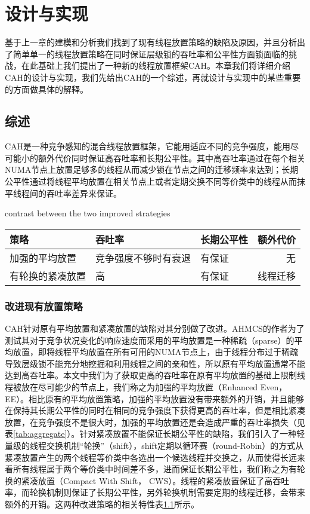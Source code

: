 \chapter{设计与实现}
\label{chap:faq}
基于上一章的建模和分析我们找到了现有线程放置策略的缺陷及原因，并且分析出了简单单一的线程放置策略在同时保证层级锁的吞吐率和公平性方面锁面临的挑战，在此基础上我们提出了一种新的线程放置框架CAH。本章我们将详细介绍CAH的设计与实现，我们先给出CAH的一个综述，再就设计与实现中的某些重要的方面做具体的解释。

\section{综述}
CAH是一种竞争感知的混合线程放置框架，它能用适应不同的竞争强度，能用尽可能小的额外代价同时保证高吞吐率和长期公平性。其中高吞吐率通过在每个相关NUMA节点上放置足够多的线程从而减少锁在节点之间的迁移频率来达到；长期公平性通过将线程平均放置在相关节点上或者定期交换不同等价类中的线程从而抹平线程间的吞吐率差异来保证。

\begin{table}[!hpb]
  \centering
    {contrast between the two improved strategies}
  \label{tab:contrast}
  \begin{tabular}{@{}lllr@{}} \toprule
    策略             & 吞吐率 & 长期公平性 & 额外代价 \\ \midrule
    加强的平均放置   & 竞争强度不够时有衰退 & 有保证  & 无\\
    有轮换的紧凑放置 & 高 & 有保证  & 线程迁移\\
  \end{tabular}
\end{table}

\subsection{改进现有放置策略}
CAH针对原有平均放置和紧凑放置的缺陷对其分别做了改进。AHMCS的作者为了测试其对于竞争状况变化的响应速度而采用的平均放置是一种稀疏（sparse）的平均放置，即将线程平均放置在所有可用的NUMA节点上，由于线程分布过于稀疏导致层级锁不能充分地挖掘和利用线程之间的亲和性，所以原有平均放置通常不能达到高吞吐率。本文中我们为了获取更高的吞吐率在原有平均放置的基础上限制线程被放在尽可能少的节点上，我们称之为加强的平均放置（Enhanced Even， EE）。相比原有的平均放置策略，加强的平均放置没有带来额外的开销，并且能够在保持其长期公平性的同时在相同的竞争强度下获得更高的吞吐率，但是相比紧凑放置，在竞争强度不是很大时，加强的平均放置还是会造成严重的吞吐率损失（见表\ref{tab:aggregate}）。针对紧凑放置不能保证长期公平性的缺陷，我们引入了一种轻量级的线程交换机制“轮换”（shift），shift定期以循环赛（round-Robin）的方式从紧凑放置产生的两个线程等价类中各选出一个候选线程并交换之，从而使得长远来看所有线程属于两个等价类中时间差不多，进而保证长期公平性，我们称之为有轮换的紧凑放置（Compact With Shift， CWS）。线程的紧凑放置保证了高吞吐率，而轮换机制则保证了长期公平性，另外轮换机制需要定期的线程迁移，会带来额外的开销。这两种改进策略的相关特性表\ref{tab:contrast}所示。

